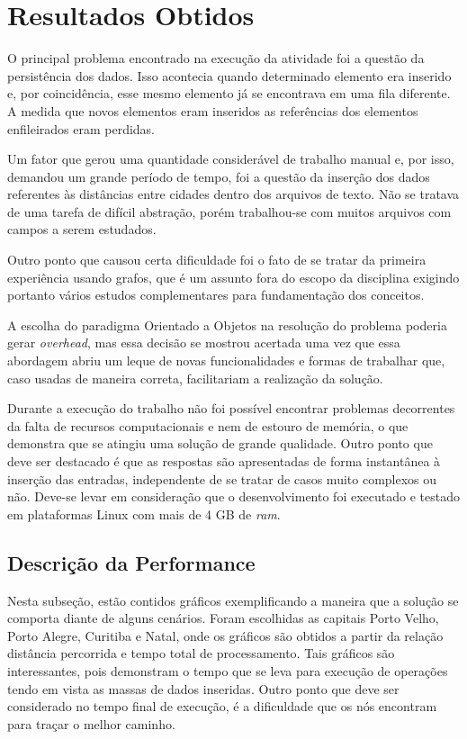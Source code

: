 \chapter[Resultados Obtidos]{Resultados Obtidos}

O principal problema encontrado na execução da atividade foi a questão da persistência dos
dados. Isso acontecia quando determinado elemento era inserido e, por coincidência, esse mesmo
elemento já se encontrava em uma fila diferente. A medida que novos elementos eram inseridos as referências dos elementos enfileirados eram perdidas.

Um fator que gerou uma quantidade considerável de trabalho manual e, por isso, demandou um grande período de tempo, foi a questão da inserção dos dados referentes às distâncias entre cidades dentro dos arquivos de
texto. Não se tratava de uma tarefa de difícil abstração, porém trabalhou-se com muitos arquivos com campos
a serem estudados.

Outro ponto que causou certa dificuldade foi o fato de se tratar da primeira experiência usando grafos,
que é um assunto fora do escopo da disciplina exigindo portanto vários estudos complementares para
fundamentação dos conceitos.

A escolha do paradigma Orientado a Objetos na resolução do problema poderia gerar \textit{overhead}, mas essa decisão se mostrou acertada uma vez que essa abordagem abriu um leque de novas funcionalidades e
formas de trabalhar que, caso usadas de maneira correta, facilitariam a realização da solução.

Durante a execução do trabalho não foi possível encontrar problemas decorrentes da falta de recursos
computacionais e nem de estouro de memória, o que demonstra que se atingiu uma solução de
grande qualidade. Outro ponto que deve ser destacado é que as respostas são apresentadas de forma instantânea à inserção das entradas, independente de se tratar de casos muito complexos ou não. Deve-se levar em consideração que o desenvolvimento foi executado e testado em plataformas Linux com mais de 4 GB de \textit{ram}.

\section{Descrição da Performance}

Nesta subseção, estão contidos gráficos exemplificando a maneira que a solução se comporta diante de alguns cenários. Foram escolhidas as capitais Porto Velho, Porto Alegre, Curitiba e Natal, onde os gráficos são obtidos a partir da relação distância percorrida e tempo total de processamento. Tais gráficos são interessantes, pois demonstram o tempo que se leva para execução de operações tendo em vista as massas de dados inseridas. Outro ponto que deve ser considerado no tempo final de execução, é a dificuldade que os nós encontram para traçar o melhor caminho.

